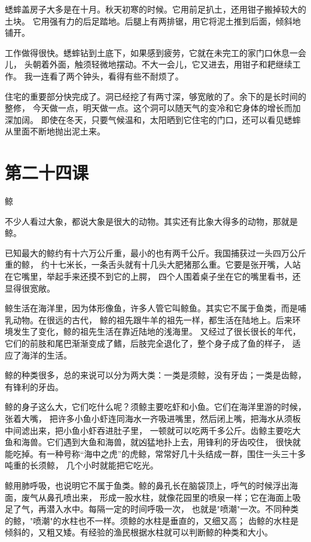 \documentclass[12pt,UTF8]{ctexbook}
\begin{document}
蟋蟀盖房子大多是在十月。秋天初寒的时候。它用前足扒土，还用钳子搬掉较大的土块。
它用强有力的后足踏地。后腿上有两排锯，用它将泥土推到后面，倾斜地铺开。

工作做得很快。蟋蟀钻到土底下，如果感到疲劳，它就在未完工的家门口休息一会儿，
头朝着外面，触须轻微地摆动。不大一会儿，它又进去，用钳子和耙继续工作。
我一连看了两个钟头，看得有些不耐烦了。

住宅的重要部分快完成了。洞已经挖了有两寸深，够宽敞的了。余下的是长时间的整修，
今天做一点，明天做一点。这个洞可以随天气的变冷和它身体的增长而加深加阔。
即使在冬天，只要气候温和，太阳晒到它住宅的门口，还可以看见蟋蟀从里面不断地抛出泥土来。

\section{第二十四课}

鲸

不少人看过大象，都说大象是很大的动物。其实还有比象大得多的动物，那就是鲸。

已知最大的鲸约有十六万公斤重，最小的也有两千公斤。我国捕获过一头四万公斤重的鲸，
约十七米长，一条舌头就有十几头大肥猪那么重。它要是张开嘴，人站在它嘴里，举起手来还摸不到它的上腭，
四个人围着桌子坐在它的嘴里看书，还显得很宽敞。

鲸生活在海洋里，因为体形像鱼，许多人管它叫鲸鱼。其实它不属于鱼类，而是哺乳动物。在很远的古代，
鲸的祖先跟牛羊的祖先一样，都生活在陆地上。后来环境发生了变化，鲸的祖先生活在靠近陆地的浅海里。
又经过了很长很长的年代，它们的前肢和尾巴渐渐变成了鳍，后肢完全退化了，整个身子成了鱼的样子，
适应了海洋的生活。

鲸的种类很多，总的来说可以分为两大类：一类是须鲸，没有牙齿；一类是齿鲸，有锋利的牙齿。

鲸的身子这么大，它们吃什么呢？须鲸主要吃虾和小鱼。它们在海洋里游的时候，张着大嘴，
把许多小鱼小虾连同海水一齐吸进嘴里，然后闭上嘴，把海水从须板中间滤出来，把小鱼小虾吞进肚子里，
一顿就可以吃两千多公斤。齿鲸主要吃大鱼和海兽。它们遇到大鱼和海兽，就凶猛地扑上去，用锋利的牙齿咬住，
很快就能吃掉。有一种号称“海中之虎”的虎鲸，常常好几十头结成一群，围住一头三十多吨重的长须鲸，
几个小时就能把它吃光。

鲸用肺呼吸，也说明它不属于鱼类。鲸的鼻孔长在脑袋顶上，呼气的时候浮出海面，废气从鼻孔喷出来，
形成一股水柱，就像花园里的喷泉一样；它在海面上吸足了气，再潜入水中。每隔一定的时间呼吸一次，
也就是"喷潮"一次。不同种类的鲸，"喷潮"的水柱也不一样。须鲸的水柱是垂直的，又细又高；
齿鲸的水柱是倾斜的，又粗又矮。有经验的渔民根据水柱就可以判断鲸的种类和大小。
\end{document}
